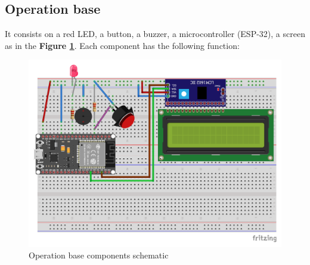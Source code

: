 \documentclass[../main.tex]{subfiles}
\begin{document}
\subsection{Operation base}

It consists on a red LED, a button, a buzzer, a microcontroller (ESP-32), a screen as in the \textbf{Figure \ref{fig:base}}. Each component has the following function:

\begin{figure}
    \centering
    \includegraphics[width= 0.8\linewidth]{../media/figures/schematic_bb.pdf}
    \caption{Operation base components schematic}
    \label{fig:base}
\end{figure}
\end{document}
